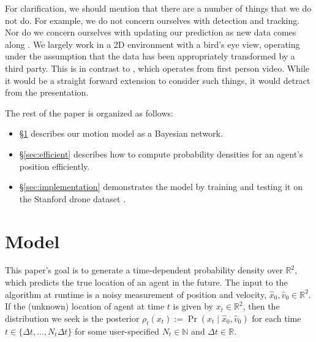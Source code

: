 \documentclass[letterpaper,10pt,conference]{ieeeconf}
\begin{document}
For clarification, we should mention that there are a number of things that we do not do.
For example, we do not concern ourselves with detection and tracking. 
Nor do we concern ourselves with updating our prediction as new data comes along \cite{Kitani2012}.
We largely work in a 2D environment with a bird's eye view, operating under the assumption that the data has been appropriately transformed by a third party.
This is in contrast to \cite{Karasev2016}, which operates from first person video.
While it would be a straight forward extension to consider such things, it would detract from the presentation.

The rest of the paper is organized as follows:
\begin{itemize}
	\item \S \ref{sec:model} describes our motion model as a Bayesian network.
	\item \S \ref{sec:efficient} describes how to compute probability densities for an agent's position efficiently.
	\item \S \ref{sec:implementation} demonstrates the model by training and testing it on the Stanford drone dataset \cite{Robicquet2016}.
\end{itemize}

\section{Model}\label{sec:model}
This paper's goal is to generate a time-dependent probability density over $\mathbb{R}^2$, which predicts the true location of an agent in the future.
The input to the algorithm at runtime is a noisy measurement of position and velocity, $\hat{x}_0, \hat{v}_0 \in \mathbb{R}^2$.
If the (unknown) location of agent at time $t$ is given by $x_t \in \mathbb{R}^2$, then the distribution we seek is the posterior $\rho_t(x_t) := \Pr( x_t \mid \hat{x}_0, \hat{v}_0 )$ for each time $t \in \{\Delta t, \dots, N_t \Delta t \}$ for some user-specified $N_t \in \mathbb{N}$ and $\Delta t \in \mathbb{R}$.
\end{document}
